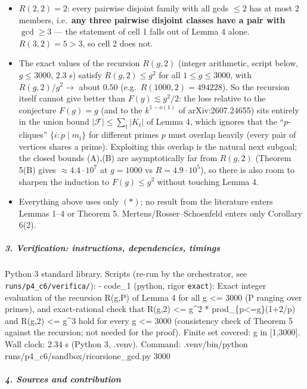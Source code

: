 \documentclass[11pt,a4paper]{article}
\providecommand{\tightlist}{\setlength{\itemsep}{0pt}\setlength{\parskip}{0pt}}
\begin{document}
\begin{itemize}
\tightlist
\item
  \(R(2,2)=2\): every pairwise disjoint family with all gcds \(\le2\)
  has at most \(2\) members, i.e.~\textbf{any three pairwise disjoint
  classes have a pair with \(\gcd\ge3\)} --- the statement of cell 1
  falls out of Lemma 4 alone. \(R(3,2)=5>3\), so cell 2 does not.
\item
  The exact values of the recursion \(R(g,2)\) (integer arithmetic,
  script below, \(g\le3000\), 2.3 s) satisfy \(R(g,2)\le g^2\) for all
  \(1\le g\le 3000\), with \(R(g,2)/g^2\to\) about \(0.50\)
  (e.g.~\(R(1000,2)=494228\)). So the recursion itself cannot give
  better than \(F(g)\lesssim g^2/2\): the loss relative to the
  conjecture \(F(g)=g\) (and to the \(k^{1-o(1)}\) of arXiv:2607.24655)
  sits entirely in the union bound \(|\mathcal F|\le\sum_t|K_t|\) of
  Lemma 4, which ignores that the ``\(p\)-cliques'' \(\{i:p\mid m_i\}\)
  for different primes \(p\) must overlap heavily (every pair of
  vertices shares a prime). Exploiting this overlap is the natural next
  subgoal; the closed bounds (A),(B) are asymptotically far from
  \(R(g,2)\) (Theorem 5(B) gives \(\approx 4.4\cdot10^7\) at \(g=1000\)
  vs \(R=4.9\cdot10^5\)), so there is also room to sharpen the induction
  to \(F(g)\le g^2\) without touching Lemma 4.
\item
  Everything above uses only \((*)\); no result from the literature
  enters Lemmas 1--4 or Theorem 5. Mertens/Rosser--Schoenfeld enters
  only Corollary 6(2).
\end{itemize}

\subparagraph{3. Verification: instructions, dependencies,
timings}\label{verification-instructions-dependencies-timings}

Python 3 standard library. Scripts (re-run by the orchestrator, see
\texttt{runs/p4\_c6/verifica/}): - code\_1 (python, rigor
\texttt{exact}): Exact integer evaluation of the recursion R(g,P) of
Lemma 4 for all g \textless= 3000 (P ranging over primes), and
exact-rational check that R(g,2) \textless= g\^{}2 *
prod\_\{p\textless=g\}(1+2/p) and R(g,2) \textless= g\^{}3 hold for
every g \textless= 3000 (consistency check of Theorem 5 against the
recursion; not needed for the proof). Finite set covered: g in
{[}1,3000{]}. Wall clock: 2.34 s (Python 3, .venv). Command:
.venv/bin/python runs/p4\_c6/sandbox/ricorsione\_gcd.py 3000

\subparagraph{4. Sources and
contribution}\label{sources-and-contribution}
\end{document}
